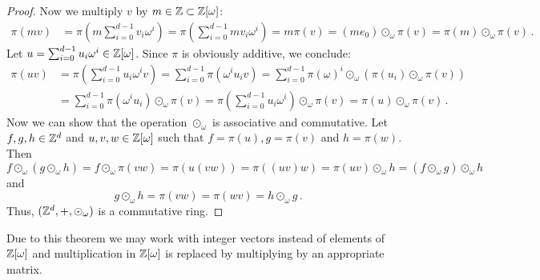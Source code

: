 \begin{proof}
Now we multiply $v$ by $m\in\mathbb{Z}\subset\mathbb{Z}[\omega]$:
\begin{align*}
\pi(m v)&=\pi\left(m \sum_{i=0}^{d-1} v_i \omega^i\right)=\pi \left(\sum_{i=0}^{d-1} m v_i \omega^i\right)=m \pi(v)= (m e_0) \odot_\omega\pi(v)= \pi(m)\odot_\omega\pi(v)\,.
\end{align*}
Let $u=\sum_{i=0}^{d-1} u_i \omega^i\in\mathbb{Z}[\omega]$. Since $\pi$ is obviously additive, we conclude:
\begin{align*}
\pi(uv)&=\pi\left(\sum_{i=0}^{d-1} u_i \omega^i v\right)=\sum_{i=0}^{d-1}\pi(\omega^i u_i  v)=\sum_{i=0}^{d-1}\pi(\omega)^i \odot_\omega\left(\pi(u_i)\odot_\omega\pi(v)\right) \\
    &=\sum_{i=0}^{d-1}\pi(\omega^i u_i)\odot_\omega \pi(v)=\pi\left(\sum_{i=0}^{d-1}u_i\omega^i\right)\odot_\omega\pi(v)=\pi(u)\odot_\omega \pi(v)\,.
\end{align*}
Now we can show that the operation $\odot_\omega$ is associative and commutative. Let $f,g,h\in \mathbb{Z}^d$ and $u,v,w\in\mathbb{Z}[\omega]$ such that $f=\pi(u),g=\pi(v)$ and $h=\pi(w)$. Then
$$
f\odot_\omega(g\odot_\omega h)=f\odot_\omega\pi(vw)=\pi(u(vw))=\pi((uv)w)=\pi(uv)\odot_\omega h=(f\odot_\omega g)\odot_\omega h
$$
and
$$
g\odot_\omega h=\pi(vw)=\pi(wv)=h\odot_\omega g\,.
$$
Thus, $(\mathbb{Z}^d,+,\odot_\omega)$ is a commutative ring.
\end{proof}

Due to this theorem we may work with integer vectors instead of elements of $\mathbb{Z}[\omega]$ and multiplication in $\mathbb{Z}[\omega]$ is replaced by multiplying by an appropriate matrix. 

